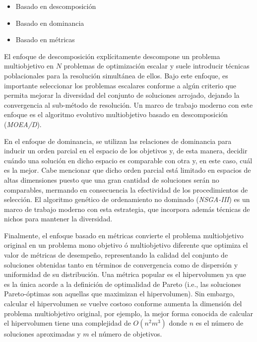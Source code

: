 \documentclass[letterpaper,10pt]{article}
\begin{document}
\begin{itemize}
 \item Basado en descomposición
 \item Basado en dominancia
 \item Basado en métricas
\end{itemize}

El enfoque de descomposición explícitamente descompone un problema multiobjetivo en $N$ problemas de optimización escalar y suele introducir técnicas poblacionales para
la resolución simultánea de ellos. Bajo este enfoque, es importante seleccionar los problemas escalares conforme a algún criterio que permita mejorar la diversidad del conjunto
de soluciones arrojado, dejando la convergencia al sub-método de resolución. Un marco de trabajo moderno con este enfoque es el algoritmo evolutivo multiobjetivo basado en
descomposición (\emph{MOEA/D})\cite{4358754}.
\newline

En el enfoque de dominancia, se utilizan las relaciones de dominancia para inducir un orden parcial en el espacio de los objetivos y, de esta manera, decidir cuándo una solución
en dicho espacio es comparable con otra y, en este caso, cuál es la mejor. Cabe mencionar que dicho orden parcial está limitado en espacios de altas dimensiones puesto que una gran
cantidad de soluciones serán no comparables, mermando en consecuencia la efectividad de los procedimientos de selección. El algoritmo genético de ordenamiento no dominado
(\emph{NSGA-III})\cite{6600851} es un marco de trabajo moderno con esta estrategia, que incorpora además técnicas de nichos para mantener la diversidad.
\newline

Finalmente, el enfoque basado en métricas convierte el problema multiobjetivo original en un problema mono objetivo ó multiobjetivo diferente que optimiza el valor de métricas de desempeño,
representando la calidad del conjunto de soluciones obtenidas tanto en términos de convergencia como de dispersión y uniformidad de su distribución. Una métrica popular
es el hipervolumen ya que es la única acorde a la definición de  optimalidad de Pareto (i.e., las soluciones Pareto-óptimas son aquellas que maximizan el hipervolumen).
Sin embargo, calcular el hipervolumen se vuelve costoso conforme aumenta la dimensión del problema multiobjetivo original, por ejemplo, la mejor forma conocida de calcular
el hipervolumen tiene una complejidad de $O(n^2m^3)$ donde $n$ es el número de soluciones aproximadas y $m$ el número de objetivos.
\newline
\end{document}
